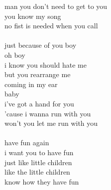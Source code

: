 \documentclass[conference]{IEEEtran}
\begin{document}
man you don't need to get to you \\
you know my song \\
no fist is needed when you call \\
\\
just because of you boy \\
oh boy \\
i know you should hate me \\
but you rearrange me \\
coming in my ear \\
baby \\
i've got a hand for you \\
'cause i wanna run with you \\
won't you let me run with you \\
\\
have fun again \\
i want you to have fun \\
just like little children \\
like the little children \\
know how they have fun \\
\end{document}
